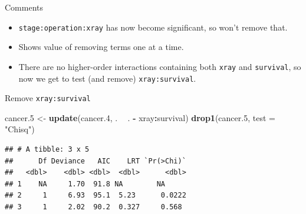 \documentclass[
  ignorenonframetext,
]{beamer}
\newenvironment{Shaded}{\begin{snugshade}}{\end{snugshade}}
\newcommand{\DataTypeTok}[1]{\textcolor[rgb]{0.13,0.29,0.53}{#1}}
\newcommand{\FloatTok}[1]{\textcolor[rgb]{0.00,0.00,0.81}{#1}}
\newcommand{\KeywordTok}[1]{\textcolor[rgb]{0.13,0.29,0.53}{\textbf{#1}}}
\newcommand{\NormalTok}[1]{#1}
\newcommand{\OperatorTok}[1]{\textcolor[rgb]{0.81,0.36,0.00}{\textbf{#1}}}
\newcommand{\StringTok}[1]{\textcolor[rgb]{0.31,0.60,0.02}{#1}}
\begin{document}
\begin{frame}[fragile]{Comments}
\protect\hypertarget{comments-53}{}

\begin{itemize}
\item
  \texttt{stage:operation:xray} has now become significant, so won't
  remove that.
\item
  Shows value of removing terms one at a time.
\item
  There are no higher-order interactions containing both \texttt{xray}
  and \texttt{survival}, so now we get to test (and remove)
  \texttt{xray:survival}.
\end{itemize}

\end{frame}

\begin{frame}[fragile]{Remove \texttt{xray:survival}}
\protect\hypertarget{remove-xraysurvival}{}

\scriptsize

\begin{Shaded}
\begin{Highlighting}[]
\NormalTok{cancer}\FloatTok{.5}\NormalTok{ <-}\StringTok{ }\KeywordTok{update}\NormalTok{(cancer}\FloatTok{.4}\NormalTok{, . }\OperatorTok{~}\StringTok{ }\NormalTok{. }\OperatorTok{-}\StringTok{ }\NormalTok{xray}\OperatorTok{:}\NormalTok{survival)}
\KeywordTok{drop1}\NormalTok{(cancer}\FloatTok{.5}\NormalTok{, }\DataTypeTok{test =} \StringTok{"Chisq"}\NormalTok{)}
\end{Highlighting}
\end{Shaded}

\begin{verbatim}
## # A tibble: 3 x 5
##      Df Deviance   AIC    LRT `Pr(>Chi)`
##   <dbl>    <dbl> <dbl>  <dbl>      <dbl>
## 1    NA     1.70  91.8 NA        NA     
## 2     1     6.93  95.1  5.23      0.0222
## 3     1     2.02  90.2  0.327     0.568
\end{verbatim}

\normalsize

\end{frame}
\end{document}
